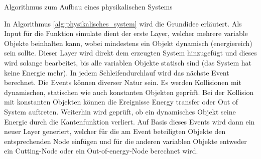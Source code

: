 \begin{algorithm}[H]
    \DontPrintSemicolon
    \;
    \caption{Algorithmus zum Aufbau eines physikalischen Systems}
    \label{alg:physikalisches_system}
\end{algorithm}
In Algorithmus \ref{alg:physikalisches_system} wird die Grundidee erläutert. Als Input für die Funktion \glqq simulate\grqq{}
dient der erste Layer, welcher mehrere variable Objekte beinhalten kann, wobei mindestens ein Objekt dynamisch (energiereich)
sein sollte. Dieser Layer wird direkt dem erzeugten System hinzugefügt und dieses wird solange bearbeitet, bis alle variablen
Objekte statisch sind (das System hat keine Energie mehr). In jedem Schleifendurchlauf wird das nächste Event berechnet.
Die Events können diverser Natur sein. Es werden Kollisionen mit dynamischen, statischen wie auch konstanten Objekten
geprüft. Bei der Kollision mit konstanten Objekten können die Ereignisse \glqq Energy transfer\grqq{} oder \glqq Out of
System\grqq{} auftreten. Weiterhin wird geprüft, ob ein dynamisches Objekt seine Energie durch die Kantenfunktion
verliert. Auf Basis dieses Events wird dann ein neuer Layer generiert, welcher für die am Event beteiligten Objekte
den entsprechenden Node einfügen und für die anderen variablen Objekte entweder ein \glqq Cutting-Node\grqq{} oder ein
\glqq{} Out-of-energy-Node\grqq{} berechnet wird.